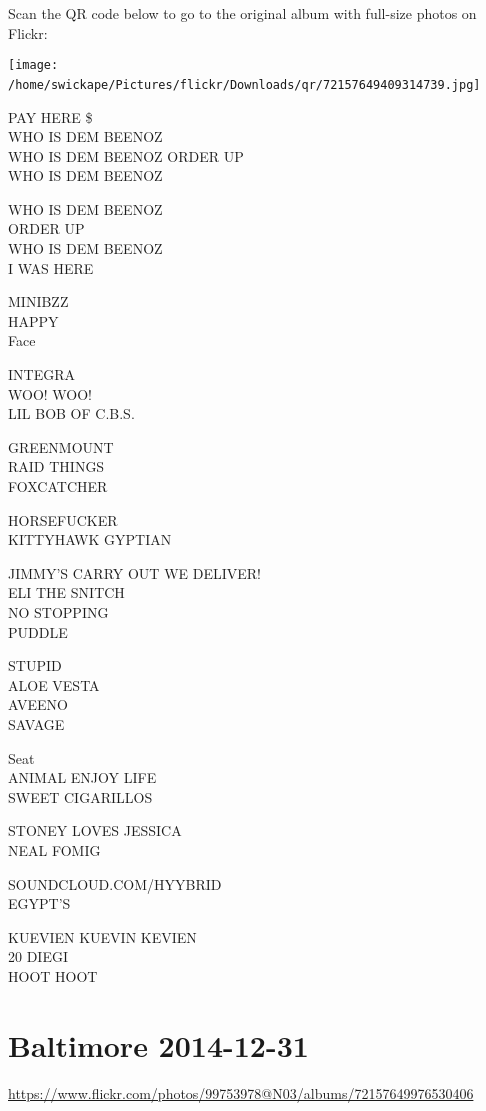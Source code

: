 \documentclass[10pt,letterpaper]{article}
\begin{document}
Scan the QR code below to go to the original album with full-size photos on Flickr:

\texttt{[image: /home/swickape/Pictures/flickr/Downloads/qr/72157649409314739.jpg]}
\

PAY HERE \$\\
WHO IS DEM BEENOZ\\
WHO IS DEM BEENOZ ORDER UP\\
WHO IS DEM BEENOZ

WHO IS DEM BEENOZ\\
ORDER UP\\
WHO IS DEM BEENOZ\\
I WAS HERE

MINIBZZ\\
HAPPY\\
Face

INTEGRA\\
WOO!  WOO!\\
LIL BOB OF C.B.S.

GREENMOUNT\\
RAID THINGS\\
FOXCATCHER

HORSEFUCKER\\
KITTYHAWK GYPTIAN

JIMMY'S CARRY OUT WE DELIVER!\\
ELI THE SNITCH\\
NO STOPPING\\
PUDDLE

STUPID\\
ALOE VESTA\\
AVEENO\\
SAVAGE

Seat\\
ANIMAL ENJOY LIFE\\
SWEET CIGARILLOS

STONEY LOVES JESSICA\\
NEAL FOMIG

SOUNDCLOUD.COM/HYYBRID\\
EGYPT'S

KUEVIEN KUEVIN KEVIEN\\
20 DIEGI\\
HOOT HOOT
\

\section*{Baltimore 2014-12-31}

\url{https://www.flickr.com/photos/99753978@N03/albums/72157649976530406}
\end{document}
